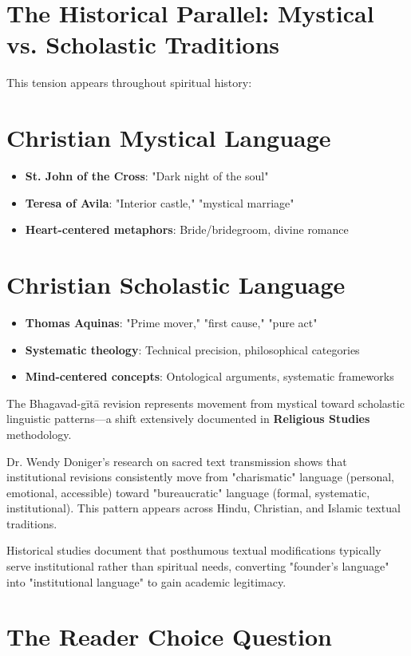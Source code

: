 \documentclass[11pt,twoside]{book}
\begin{document}
\section*{The Historical Parallel: Mystical vs. Scholastic Traditions}
\label{sec:org64765e0}

This tension appears throughout spiritual history:
\section*{Christian Mystical Language}
\label{sec:org4f3eba9}
\begin{itemize}
\item \textbf{\textbf{St. John of the Cross}}: "Dark night of the soul"
\item \textbf{\textbf{Teresa of Avila}}: "Interior castle," "mystical marriage"
\item \textbf{\textbf{Heart-centered metaphors}}: Bride/bridegroom, divine romance
\end{itemize}
\section*{Christian Scholastic Language}
\label{sec:orga7916d9}
\begin{itemize}
\item \textbf{\textbf{Thomas Aquinas}}: "Prime mover," "first cause," "pure act"
\item \textbf{\textbf{Systematic theology}}: Technical precision, philosophical categories
\item \textbf{\textbf{Mind-centered concepts}}: Ontological arguments, systematic frameworks
\end{itemize}

The Bhagavad-gītā revision represents movement from mystical toward scholastic linguistic patterns—a shift extensively documented in \textbf{\textbf{Religious Studies}} methodology.

Dr. Wendy Doniger's research on sacred text transmission shows that institutional revisions consistently move from "charismatic" language (personal, emotional, accessible) toward "bureaucratic" language (formal, systematic, institutional). This pattern appears across Hindu, Christian, and Islamic textual traditions.

Historical studies document that posthumous textual modifications typically serve institutional rather than spiritual needs, converting "founder's language" into "institutional language" to gain academic legitimacy.
\section*{The Reader Choice Question}
\label{sec:orgfbbbf6a}
\end{document}
